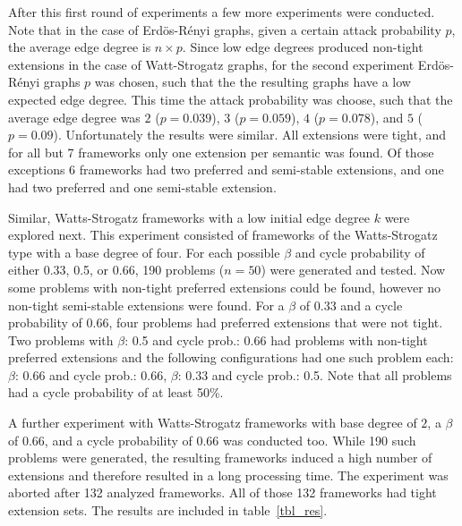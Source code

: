 \documentclass[parskip=half]{scrartcl}
\begin{document}
After this first round of experiments a few more experiments were conducted.
Note that in the case of Erdös-Rényi graphs, given a certain attack probability
$p$, the average edge degree is $n\times p$. Since low edge degrees produced
non-tight extensions in the case of Watt-Strogatz graphs, for the second
experiment Erdös-Rényi graphs $p$ was chosen, such that the the resulting graphs
have a low expected edge degree. This time the attack probability was choose,
such that the average edge degree was $2$ ($p=0.039$), $3$ ($p=0.059$), $4$
($p=0.078$), and $5$ ($p=0.09$).  Unfortunately the results were similar. All
extensions were tight, and for all but 7 frameworks only one extension per
semantic was found. Of those exceptions 6 frameworks had two preferred and
semi-stable extensions, and one had two preferred and one semi-stable extension.

Similar, Watts-Strogatz frameworks with a low initial edge degree $k$ were
explored next.  This experiment consisted of frameworks of the Watts-Strogatz
type with a base degree of four.  For each possible $\beta$ and cycle
probability of either 0.33, 0.5, or 0.66, 190 problems ($n=50$) were generated
and tested. Now some problems with non-tight preferred extensions could be
found, however no non-tight semi-stable extensions were found. For a $\beta$ of
0.33 and a cycle probability of 0.66, four problems had preferred extensions
that were not tight. Two problems with $\beta$: 0.5 and cycle prob.: 0.66 had
problems with non-tight preferred extensions and the following configurations
had one such problem each: $\beta$: 0.66 and cycle prob.: 0.66, $\beta$: 0.33
and cycle prob.: 0.5.  Note that all problems had a cycle probability of at
least 50\%.

A further experiment with Watts-Strogatz frameworks with base degree
of $2$, a $\beta$ of 0.66, and a cycle probability of 0.66 was conducted too.
While 190 such problems were generated, the resulting frameworks induced a
high number of extensions and therefore resulted in a long processing time.
The experiment was aborted after 132 analyzed frameworks.
All of those 132 frameworks had tight extension sets. The results are
included in table~\ref{tbl_res}.
\end{document}
